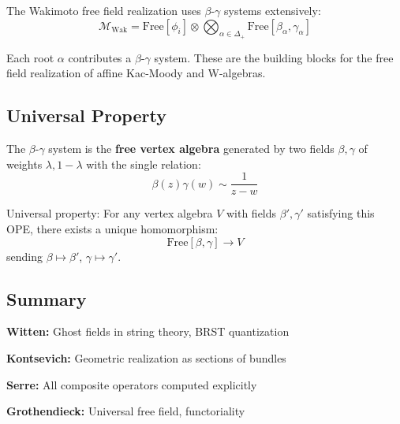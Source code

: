 \begin{remark}
The Wakimoto free field realization uses $\beta$-$\gamma$ systems extensively:
$$\mathcal{M}_{\text{Wak}} = \text{Free}[\phi_i] \otimes \bigotimes_{\alpha \in \Delta_+} \text{Free}[\beta_\alpha, \gamma_\alpha]$$

Each root $\alpha$ contributes a $\beta$-$\gamma$ system. These are the building blocks 
for the free field realization of affine Kac-Moody and W-algebras.
\end{remark}

\subsection{Universal Property}

\begin{theorem}
\label{thm:beta-gamma-universal}
The $\beta$-$\gamma$ system is the \textbf{free vertex algebra} generated by two fields 
$\beta, \gamma$ of weights $\lambda, 1-\lambda$ with the single relation:
$$\beta(z)\gamma(w) \sim \frac{1}{z-w}$$

Universal property: For any vertex algebra $V$ with fields $\beta', \gamma'$ satisfying 
this OPE, there exists a unique homomorphism:
$$\text{Free}[\beta, \gamma] \to V$$
sending $\beta \mapsto \beta'$, $\gamma \mapsto \gamma'$.
\end{theorem}

\subsection{Summary}

\begin{summary}
\textbf{Witten:} Ghost fields in string theory, BRST quantization

\textbf{Kontsevich:} Geometric realization as sections of bundles

\textbf{Serre:} All composite operators computed explicitly

\textbf{Grothendieck:} Universal free field, functoriality
\end{summary}


